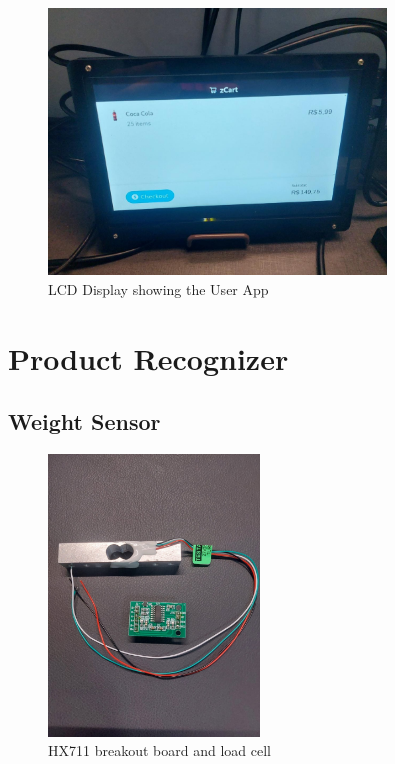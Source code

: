 \documentclass[openright]{normas-utf-tex} %
\begin{document}
\begin{figure}[H]
	\centering
	\includegraphics[width=0.8\textwidth]{./images/lcddisplay.jpeg}
	\caption[LCD Display showing the User App]{LCD Display showing the User App}
	\label{fig:dummy}
\end{figure}

\section{Product Recognizer}

\subsection{Weight Sensor}

\begin{figure}[H]
	\centering
	\includegraphics[width=0.5\textwidth]{./images/hx711.jpeg}
	\caption[HX711 breakout board and load cell]{HX711 breakout board and load cell}
	\label{fig:dummy}
\end{figure}
\end{document}
